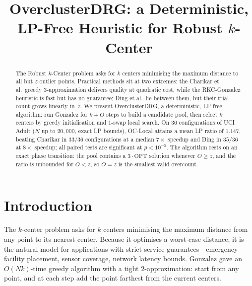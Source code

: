 \documentclass[twoside,leqno,twocolumn]{article}
\newcommand{\OPT}{\mathrm{OPT}}
\begin{document}
\newcommand\relatedversion{}

\title{\Large OverclusterDRG: a Deterministic, LP-Free Heuristic for
Robust $k$-Center\relatedversion}

\date{}
\maketitle


\begin{abstract}
The Robust $k$-Center problem asks for $k$ centers minimising the
maximum distance to all but $z$ outlier points. Practical methods sit
at two extremes: the Charikar et al.\ greedy $3$-approximation delivers
quality at quadratic cost, while the RKC-Gonzalez heuristic is fast
but has no guarantee; Ding et al.\ lie between them, but their trial
count grows linearly in~$z$. We present OverclusterDRG, a
deterministic, LP-free algorithm: run Gonzalez for $k+O$ steps to
build a candidate pool, then select $k$ centers by greedy
initialisation and $1$-swap local search. On 36 configurations of UCI
Adult ($N$ up to $20{,}000$, exact LP bounds), OC-Local attains a mean
LP ratio of $1.147$, beating Charikar in $33/36$ configurations at a
median $7\times$ speedup and Ding in $35/36$ at $8\times$ speedup; all
paired tests are significant at $p<10^{-5}$. The algorithm rests on an
exact phase transition: the pool contains a $3\cdot\OPT$ solution
whenever $O\ge z$, and the ratio is unbounded for $O<z$, so $O=z$ is
the smallest valid overcount.
\end{abstract}


\section{Introduction}

The $k$-center problem asks for $k$ centers minimising the
maximum distance from any point to its nearest center. Because it
optimises a worst-case distance, it is the natural model for
applications with strict service guarantees---emergency facility
placement, sensor coverage, network latency bounds. Gonzalez
\cite{gonzalez1985} gave an $O(Nk)$-time greedy algorithm with a
tight $2$-approximation: start from any point, and at each step add
the point farthest from the current centers.
\end{document}
